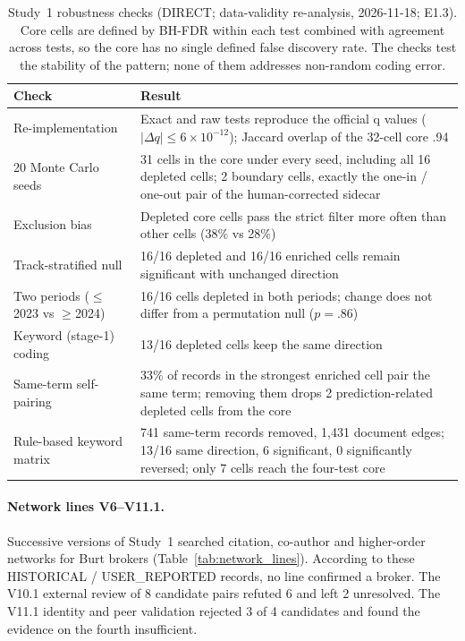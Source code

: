 \begin{table}[tbp]
\centering
\caption{Study~1 robustness checks (DIRECT; data-validity re-analysis, 2026-11-18; E1.3). Core cells are defined by BH-FDR within each test \citep{benjamini1995controlling} combined with agreement across tests, so the core has no single defined false discovery rate. The checks test the stability of the pattern; none of them addresses non-random coding error.}
\label{tab:app_s1robust}
\footnotesize
\begin{tabular}{p{3.6cm}p{11.0cm}}
\toprule
Check & Result \tabularnewline
\midrule
\raggedright Re-implementation & \raggedright Exact and raw tests reproduce the official q values ($|\Delta q|\leq 6\times10^{-12}$); Jaccard overlap of the 32-cell core .94 \tabularnewline
\raggedright 20 Monte Carlo seeds & \raggedright 31 cells in the core under every seed, including all 16 depleted cells; 2 boundary cells, exactly the one-in / one-out pair of the human-corrected sidecar \tabularnewline
\raggedright Exclusion bias & \raggedright Depleted core cells pass the strict filter more often than other cells (38\% vs 28\%) \tabularnewline
\raggedright Track-stratified null & \raggedright 16/16 depleted and 16/16 enriched cells remain significant with unchanged direction \tabularnewline
\raggedright Two periods ($\leq$2023 vs $\geq$2024) & \raggedright 16/16 cells depleted in both periods; change does not differ from a permutation null ($p=.86$) \tabularnewline
\raggedright Keyword (stage-1) coding & \raggedright 13/16 depleted cells keep the same direction \tabularnewline
\raggedright Same-term self-pairing & \raggedright 33\% of records in the strongest enriched cell pair the same term; removing them drops 2 prediction-related depleted cells from the core \tabularnewline
\raggedright Rule-based keyword matrix & \raggedright 741 same-term records removed, 1,431 document edges; 13/16 same direction, 6 significant, 0 significantly reversed; only 7 cells reach the four-test core \tabularnewline
\bottomrule
\end{tabular}
\end{table}

\paragraph{Network lines V6--V11.1.} Successive versions of Study~1 searched citation, co-author and higher-order networks for Burt brokers (Table~\ref{tab:network_lines}). According to these HISTORICAL / USER\_REPORTED records, no line confirmed a broker. The V10.1 external review of 8 candidate pairs refuted 6 and left 2 unresolved. The V11.1 identity and peer validation rejected 3 of 4 candidates and found the evidence on the fourth insufficient.

